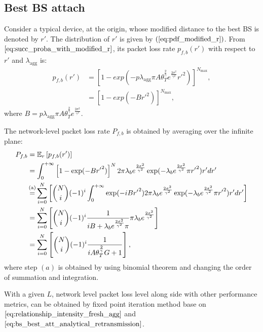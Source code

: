 \subsection{Best BS attach}
Consider a typical device, at the origin, whose modified distance to the best BS is denoted by $r'$. The distribution of $r'$ is given by $(\ref{eq:pdf_modified_r})$. From $\eqref{eq:succ_proba_with_modified_r}$, its packet loss rate $p_{f, b}(r')$ with respect to $r'$ and $\lambda_{\text{agg}}$ is:
\begin{align}
	\label{eq: fail_proba_with_modified_r_retrans}
	p_{f, b}(r') &= \left[ 1 - exp(-p \lambda_{\text{agg}} \pi A \theta_{T}^{\frac{2}{\gamma}} e^{\frac{2\sigma^2}{\gamma^2}}  {r'} ^ 2)\right] ^{N_{\text{max}}}, \nonumber \\
	&= \left[ 1 - exp(-B {r'} ^ 2)\right] ^{N_{\text{max}}},
\end{align} 
where $B = p \lambda_{\text{agg}} \pi A \theta_{T}^{\frac{2}{\gamma}} e^{\frac{2\sigma^2}{\gamma^2}} $.

The network-level packet loss rate $P_{f,b}$ is obtained by averaging over the infinite plane:
\begin{align}
	\label{eq:bs_best_att_analytical_retransmission}
	P_{f,b} &= \mathbb{E}_{r}\left[ p_{f, b}(r') \right]  \nonumber\\
	&= \int_{0}^{+\infty}  \left[ 1- \exp(-B {r'}^2 ) \right] ^{N} 2 \pi \lambda_b e^{\frac{2\sigma^2}{\gamma^2}}  \exp( -\lambda_b  e^{\frac{2\sigma^2}{\gamma^2}} \pi {r'}^2 ) r' dr' \nonumber\\
	&\overset{\mathclap{\strut\text{(a)}}} =   \sum_{i=0}^{N}\left[ \binom{N}{i} (-1)^i \int_{0}^{+\infty}  \exp(-i B {r'}^2) 2 \pi \lambda_b e^{\frac{2\sigma^2}{\gamma^2}}  \exp( -\lambda_b  e^{\frac{2\sigma^2}{\gamma^2}} \pi {r'}^2 ) r' dr' \right]  \nonumber\\
	&=   \sum_{i=0}^{N}\left[ \binom{N}{i} (-1)^i \frac{1}{iB + \lambda_b  e^{\frac{2\sigma^2}{\gamma^2}} \pi }  \pi \lambda_b e^{\frac{2\sigma^2}{\gamma^2}} \right]  \nonumber\\	
	&=   \sum_{i=0}^{N}\left[ \binom{N}{i} (-1)^i \frac{1}{i A \theta_{T}^{\frac{2}{\gamma}} G + 1 } \right], 
\end{align}
where step $(a)$ is obtained by using binomial theorem and changing the order of summation and integration.

With a given $L$, network level packet loss level along side with other performance metrics, can be obtained by fixed point iteration method base on $\eqref{eq:relationship_intensity_fresh_agg}$ and $\eqref{eq:bs_best_att_analytical_retransmission}$.

